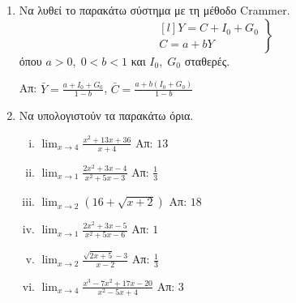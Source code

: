 \begin{enumerate}
\begin{enumerate}[i)]
    \end{enumerate}

  \item Να λυθεί το παρακάτω σύστημα με τη μέθοδο Crammer.
    \[
      \left.
        \begin{matrix*}[l]
          Y=C+I_{0}+G_{0} \\
          C=a+bY
        \end{matrix*} 
      \right\}
    \]
    όπου $ a>0,\; 0<b<1 $ και $ I_{0}, \; G_{0} $ σταθερές.

    \hfill Απ: $ \bar{Y} = \frac{a + I_{0}+G_{0}}{1-b} $, 
    $ \bar{C} = \frac{a + b(I_{0}+G_{0})}{1-b} $  

  \item Να υπολογιστούν τα παρακάτω όρια.

    \begin{enumerate}[i)]
      \item $ \lim_{x\to 4} \frac{x^{2}+13x+36}{x+4} $ \hfill Απ: $ 13 $
      \item $ \lim_{x\to 1} \frac{2x^{2}+3x-4}{x^{2}+5x-3} $ \hfill Απ: $ \frac{1}{3} $
      \item $ \lim_{x\to 2} (16+ \sqrt{x+2}) $ \hfill Απ: $ 18 $
      \item $ \lim_{x\to 1} \frac{2x^{2}+3x-5}{x^{2}+5x-6} $ \hfill Απ: $ 1 $
      \item $ \lim_{x\to 2} \frac{\sqrt{2x+5} - 3}{x-2} $ \hfill Απ: $ \frac{1}{3} $
      \item $ \lim_{x\to 4} \frac{x^{3}-7x^{2}+17x-20}{x^{2}-5x+4} $ \hfill Απ: $ 3 $ 
    \end{enumerate}


\end{enumerate}
